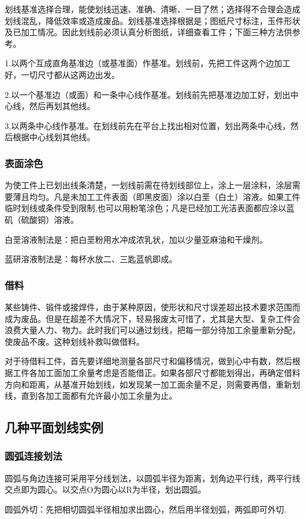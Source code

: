\documentclass{ctexbook}
\begin{document}
划线基准选择合理，能使划线迅速、准确、清晰、一目了然；选择得不合理会造成划线混乱，降低效率或造成废品。划线基准选择根据是；图纸尺寸标注，玉件形状及已加工情况。因此划线前必须认真分析图纸，详细查看工件；下面三种方法供参考。

1.以两个互成直角基准边（或基准面）作基准。划线前，先把工件这两个边加工好，一切尺寸都从这两边出发。

2.以一个基准边（或面）和一条中心线作基准。划线前先把基准边加工好，划出中心线，然后再划其他线。

3.以两条中心线作基准。在划线前先在平台上找出相对位置，划出两条中心线，然后根据中心线划其他线。
\subsubsection{表面涂色}
为使工件上已划出线条清楚，一划线前需在待划线部位上，涂上一层涂料，涂层需要薄且均匀。凡是未加工工件表面（即黑皮面）涂以白垩（白土）溶液。如果工件临时划线或条件受到限制,也可以用粉笔涂色；凡是已经加工光洁表面都应涂以蓝矶（硫酸铜）溶液。

白垩溶液制法是：把白垩粉用水冲成浓乳状，加以少量亚麻油和干燥剂。

蓝研溶液制法是：每杯水放二、三匙蓝帆即成。
\subsubsection{借料}
某些铸件、锻件或接焊件，由于某种原因，使形状和尺寸误差超出技术要求范围而成为废品。但是在超差不大情况下，轻易报废太可惜了，尤其是大型、复杂工件会浪费大量人力、物力。此时我们可以通过划线，把每一部分待加工余量重新分配，使废品不废。这种划线补救叫做借料。

对于待借料工件，首先要详细地测量各部尺寸和偏移情况，做到心中有数，然后根据工件各加工面加工余量考虑是否能借正。如果各部尺寸都能划得出，再确定借料方向和距离，从基准开始划线，如发现某一加工面余量不足，则需要再借，重新划线，直到各加工面都有允许最小加工余量为止。
\subsection{几种平面划线实例}
\subsubsection{圆弧连接划法}
圆弧与角边连接可采用平分线划法，以圆弧半径为距离，划角边平行线，两平行线交点即为圆心。以交点O为圆心以R为半径，划出圆弧。

圆弧外切：先把相切圆弧半径相加求出圆心，然后用半径划弧，两弧即可外切.
\end{document}
